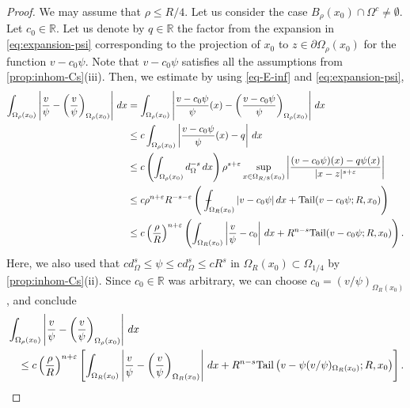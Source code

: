 \documentclass[11pt,reqno]{amsart}
\theoremstyle{plain}
\theoremstyle{definition}
\numberwithin{equation}{section}
\newcommand{\R}{\mathbb{R}}
\newcommand{\eps}{\varepsilon}
\newcommand{\1}{\mathbbm{1}}
\renewcommand{\d}{\textnormal{\,d}}
\newcommand{\average}{{\mathchoice {\kern1ex\vcenter{\hrule height.4pt
width 6pt depth0pt} \kern-9.7pt} {\kern1ex\vcenter{\hrule
height.4pt width 4.3pt depth0pt} \kern-7pt} {} {} }}
\newcommand{\dashint}{\average\int}
\begin{document}
\begin{proof}
We may assume that $\rho \leq R/4$. Let us consider the case $B_{\rho}(x_0) \cap \Omega^c \not= \emptyset$.
Let $c_0 \in \R$.
Let us denote by $q \in \R$ the factor from the expansion in  \eqref{eq:expansion-psi} corresponding to the projection of $x_0$ to $z \in \partial \Omega_{\rho}(x_0)$ for the function $v - c_0 \psi$. Note that $v-c_0 \psi$ satisfies all the assumptions from \autoref{prop:inhom-Cs}(iii). Then, we estimate by using \eqref{eq-E-inf} and \eqref{eq:expansion-psi},
\begin{align*}
\int_{\Omega_{\rho}(x_0)} \left|\frac{v}{\psi} - \left( \frac{v}{\psi} \right)_{\Omega_{\rho}(x_0)} \right| \d x &= \int_{\Omega_{\rho}(x_0)} \left|\frac{v - c_0 \psi}{\psi}(x) - \left( \frac{v - c_0 \psi}{\psi} \right)_{\Omega_{\rho}(x_0)} \right| \d x \\
& \le c \int_{\Omega_{\rho}(x_0)} \left|\frac{v - c_0 \psi}{\psi}(x) - q \right| \d x \\
&\le c \left( \int_{\Omega_{\rho}(x_0)} d_{\Omega}^{-s} \d x \right) \rho^{s+\eps} \sup_{x \in \Omega_{R/8}(x_0)} \left|\frac{(v - c_0 \psi)(x) - q \psi(x)}{|x-z|^{s+\eps}} \right|\\ 
&\le c \rho^{n+\eps} R^{-s-\eps} \left( \dashint_{\Omega_R(x_0)} |v-c_0 \psi| \d x + \mathrm{Tail}(v-c_0 \psi; R,  x_0) \right) \\
&\le c \left( \frac{\rho}{R} \right)^{n+\eps} \left( \int_{\Omega_{R}(x_0)} \left| \frac{v}{\psi}-c_0 \right| \d x + R^{n-s} \mathrm{Tail}(v-c_0 \psi; R,x_0) \right).
\end{align*}
Here, we also used that $c d^s_{\Omega} \le \psi \le cd^s_{\Omega} \le c R^s$ in $\Omega_R(x_0) \subset \Omega_{1/4}$ by \autoref{prop:inhom-Cs}(ii). Since $c_0 \in \R$ was arbitrary, we can choose $c_0 = (v/\psi)_{\Omega_R(x_0)}$, and conclude
\begin{align}
\label{eq:ti-Campanato-local-inhom}
\begin{split}
& \int_{\Omega_{\rho}(x_0)} \left|\frac{v}{\psi} - \left( \frac{v}{\psi} \right)_{\Omega_{\rho}(x_0)} \right| \d x \\
&\quad \le c \left( \frac{\rho}{R} \right)^{n+\eps} \left[ \int_{\Omega_{R}(x_0)} \left| \frac{v}{\psi} - \left( \frac{v}{\psi} \right)_{\Omega_R(x_0)} \right| \d x + R^{n-s} \mathrm{Tail} \left(v- \psi (v/\psi)_{\Omega_R(x_0)}; R, x_0 \right) \right].
\end{split}
\end{align}


\end{proof}
\end{document}
